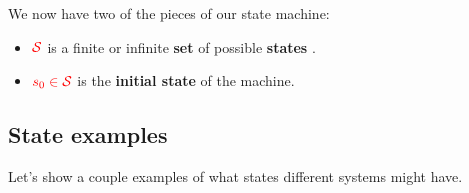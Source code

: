         We now have two of the pieces of our state machine:
            
        \begin{itemize}
            \item $\textcolor{red}{\mathcal{S}}$ is a finite or infinite \textbf{set} of possible \textbf{states} .
            \item $\textcolor{red}{s_0 \in \mathcal{S}}$ is the \textbf{initial state} of the machine. 
        \end{itemize}




    \phantom{}

    \subsection{State examples}
        Let's show a couple examples of what states different systems might have.
        
